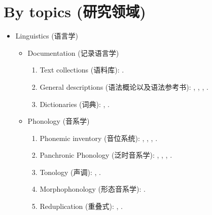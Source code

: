 \documentclass[oneside,a4paper,11pt]{article}
\newcommand{\zh}[1]{{\cn #1}}
\newcommand{\lingua}[3]{#1 (\zh{#3})}
\begin{document}
\section{\lingua{By topics}{Publications classées par domaine de recherche}{研究领域}}
\begin{itemize}
\item  \lingua{Linguistics}{Linguistique}{语言学}
\begin{itemize}
\item  \lingua{Documentation}{Documentation}{记录语言学}
\begin{enumerate}
\item  \lingua{Text collections}{Collections de textes}{语料库}: \cite{jacques10gesar}.
\item \lingua{General descriptions}{Descriptions générales}{语法概论以及语法参考书}: \cite{jacques04these}, \cite{jacques08}, \cite{jacques17sketch}, \cite{jacques17stau}.
\item \lingua{Dictionaries}{Dictionnaires}{词典}: \cite{jacques15japhug}, \cite{jacques15khaling}.
\end{enumerate}

\item \lingua{Phonology}{Phonologie}{音系学}
\begin{enumerate}
\item  \lingua{Phonemic inventory}{Inventaire phonémique}{音位系统}: \cite{jacques04these},  \cite{jacques12khaling}, \cite{jacques14cone}, \cite{jacques18ipa}.
\item  \lingua{Panchronic Phonology}{Phonologie panchronique}{泛时音系学}:  \cite{jacques11lingua}, \cite{michaud-jacques12nasalite},     \cite{jacques13arapaho}, \cite{jacques16phono.arapaho}.
\item   \lingua{Tonology}{Tonologie}{声调}: \cite{jacques11pumi.tone}, \cite{jacques16tonogenesis}.
\item \lingua{Morphophonology}{Morphophonologie}{形态音系学}: \cite{jacques12khaling}.
\item \lingua{Reduplication}{Réduplication}{重叠式}:  \cite{jacques04redupl},  \cite{jacques07redupl}.
\end{enumerate}


\end{itemize}
\end{itemize}
\end{document}
